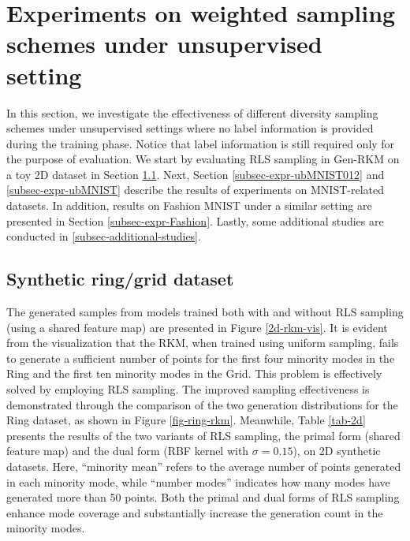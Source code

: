 \section{Experiments on weighted sampling schemes under unsupervised setting}
\label{sec-expr-unsupervised}
In this section, we investigate the effectiveness of different diversity sampling schemes under unsupervised settings where no label information is provided during the training phase. Notice that label information is still required only for the purpose of evaluation. We start by evaluating RLS sampling in Gen-RKM on a toy 2D dataset in Section \ref{subsec-ringgrid}. Next, Section \ref{subsec-expr-ubMNIST012} and \ref{subsec-expr-ubMNIST} describe the results of experiments on MNIST-related datasets. In addition, results on Fashion MNIST under a similar setting are presented in Section \ref{subsec-expr-Fashion}. Lastly, some additional studies are conducted in \ref{subsec-additional-studies}.

\subsection{Synthetic ring/grid dataset}
\label{subsec-ringgrid}
The generated samples from models trained both with and without RLS sampling (using a shared feature map) are presented in Figure \ref{2d-rkm-vis}. It is evident from the visualization that the RKM, when trained using uniform sampling, fails to generate a sufficient number of points for the first four minority modes in the Ring and the first ten minority modes in the Grid. This problem is effectively solved by employing RLS sampling. The improved sampling effectiveness is demonstrated through the comparison of the two generation distributions for the Ring dataset, as shown in Figure \ref{fig-ring-rkm}. Meanwhile, Table \ref{tab-2d} presents the results of the two variants of RLS sampling, the primal form (shared feature map) and the dual form (RBF kernel with $\sigma=0.15$), on 2D synthetic datasets. Here, “minority mean” refers to the average number of points generated in each minority mode, while “number modes” indicates how many modes have generated more than 50 points. Both the primal and dual forms of RLS sampling enhance mode coverage and substantially increase the generation count in the minority modes.

